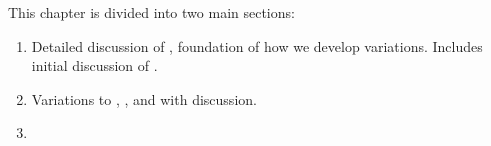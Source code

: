 \begin{note}
  This chapter is divided into two main sections:
  \begin{enumerate}[label=, leftmargin=*]
  \item

    Detailed discussion of , foundation of how we develop variations.
    Includes initial discussion of .
  \item

    Variations to \qWhy{}, \qHow{}, and \issueInclusion{} with discussion.
  \item

  \end{enumerate}
\end{note}







